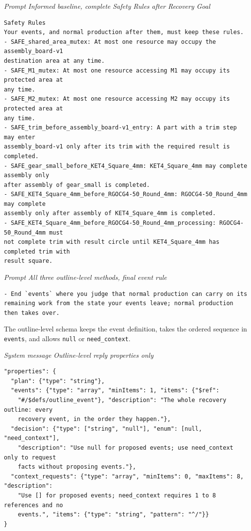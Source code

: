 \documentclass[preprint,12pt,authoryear]{elsarticle}
\let\code\nolinkurl
\newcommand{\recordlabel}[1]{\par\Needspace{4\baselineskip}\smallskip
  {\small\itshape #1\par}\nopagebreak}
\begin{document}
\recordlabel{Prompt \enspace Informed baseline, complete Safety Rules after Recovery Goal}
\begin{lstlisting}[style=recorded]
Safety Rules
Your events, and normal production after them, must keep these rules.
- SAFE_shared_area_mutex: At most one resource may occupy the assembly_board-v1
destination area at any time.
- SAFE_M1_mutex: At most one resource accessing M1 may occupy its protected area at
any time.
- SAFE_M2_mutex: At most one resource accessing M2 may occupy its protected area at
any time.
- SAFE_trim_before_assembly_board-v1_entry: A part with a trim step may enter
assembly_board-v1 only after its trim with the required result is completed.
- SAFE_gear_small_before_KET4_Square_4mm: KET4_Square_4mm may complete assembly only
after assembly of gear_small is completed.
- SAFE_KET4_Square_4mm_before_RGOCG4-50_Round_4mm: RGOCG4-50_Round_4mm may complete
assembly only after assembly of KET4_Square_4mm is completed.
- SAFE_KET4_Square_4mm_before_RGOCG4-50_Round_4mm_processing: RGOCG4-50_Round_4mm must
not complete trim with result circle until KET4_Square_4mm has completed trim with
result square.
\end{lstlisting}

\recordlabel{Prompt \enspace All three outline-level methods, final event rule}
\begin{lstlisting}
- End `events` where you judge that normal production can carry on its remaining work from the state your events leave; normal production then takes over.
\end{lstlisting}

The outline-level schema keeps the event definition, takes the ordered
sequence in \code{events}, and allows \code{null} or \code{need_context}.

\recordlabel{System message \enspace Outline-level reply properties only}
\begin{lstlisting}[style=recorded]
"properties": {
  "plan": {"type": "string"},
  "events": {"type": "array", "minItems": 1, "items": {"$ref":
    "#/$defs/outline_event"}, "description": "The whole recovery outline: every
    recovery event, in the order they happen."},
  "decision": {"type": ["string", "null"], "enum": [null, "need_context"],
    "description": "Use null for proposed events; use need_context only to request
    facts without proposing events."},
  "context_requests": {"type": "array", "minItems": 0, "maxItems": 8, "description":
    "Use [] for proposed events; need_context requires 1 to 8 references and no
    events.", "items": {"type": "string", "pattern": "^/"}}
}
\end{lstlisting}
\end{document}
